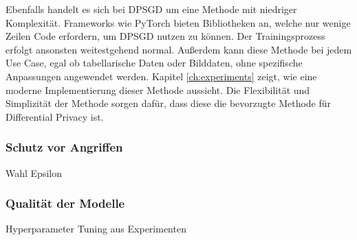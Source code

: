 Ebenfalls handelt es sich bei DPSGD um eine Methode mit niedriger Komplexität.
Frameworks wie PyTorch bieten Bibliotheken an, welche nur wenige Zeilen Code erfordern, um DPSGD nutzen zu können.
Der Trainingsprozess erfolgt ansonsten weitestgehend normal.
Außerdem kann diese Methode bei jedem Use Case, egal ob tabellarische Daten oder Bilddaten, ohne spezifische Anpassungen angewendet werden.
Kapitel \ref{ch:experiments} zeigt, wie eine moderne Implementierung dieser Methode aussieht.
Die Flexibilität und Simplizität der Methode sorgen dafür, dass diese die bevorzugte Methode für Differential Privacy ist.

\subsubsection*{Schutz vor Angriffen}
Wahl Epsilon 

\subsubsection*{Qualität der Modelle}
Hyperparameter Tuning aus Experimenten
